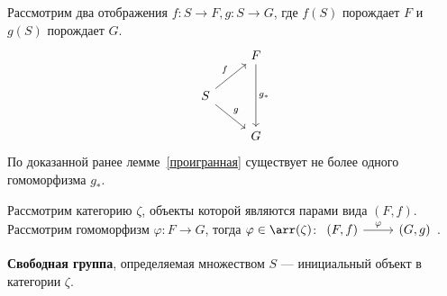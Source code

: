 Рассмотрим два отображения \(f : S \to F, g : S \to G\), где \(f(S)\) порождает \(F\) и \(g(S)\) порождает \(G\).
\[\begin{tikzcd}
        & F \arrow{dd}{g_*} \\
        S \arrow{ur}{f} \arrow{dr}{g} & \\
        & G
    \end{tikzcd}\]
По доказанной ранее лемме~\ref{проигранная} существует не более одного гомоморфизма \(g_*\).

Рассмотрим категорию \(\zeta\), объекты которой являются парами вида \((F, f)\). Рассмотрим гомоморфизм \(\varphi : F \to G\), тогда \(\varphi \in \arr(\zeta)\): \(\begin{tikzcd}
    (F, f) \arrow{r}{\varphi} & (G, g)
\end{tikzcd}\).

\begin{definition}
    \textbf{Свободная группа}, определяемая множеством \(S\) --- инициальный объект в категории \(\zeta\).
\end{definition}

